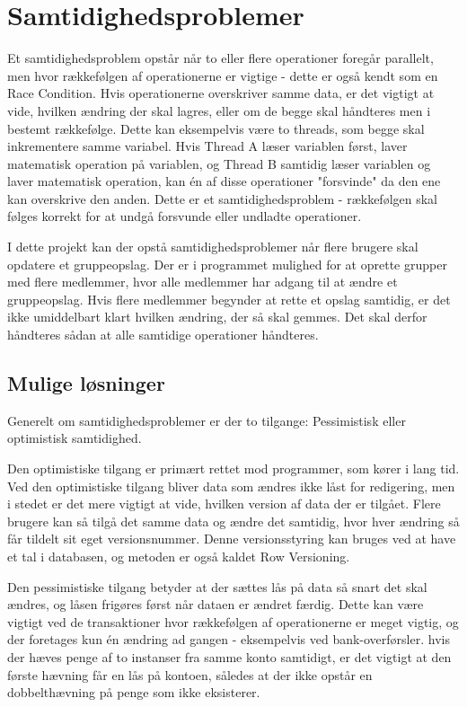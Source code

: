 \chapter{Samtidighedsproblemer}\label{ch:concurrency}
Et samtidighedsproblem opstår når to eller flere operationer foregår parallelt, men hvor rækkefølgen af operationerne er vigtige - dette er også kendt som en Race Condition.\cite{racecondition} Hvis operationerne overskriver samme data, er det vigtigt at vide, hvilken ændring der skal lagres, eller om de begge skal håndteres men i bestemt rækkefølge. Dette kan eksempelvis være to threads, som begge skal inkrementere samme variabel. Hvis Thread A læser variablen først, laver matematisk operation på variablen, og Thread B samtidig læser variablen og laver matematisk operation, kan én af disse operationer "forsvinde" da den ene kan overskrive den anden. Dette er et samtidighedsproblem - rækkefølgen skal følges korrekt for at undgå forsvunde eller undladte operationer.

I dette projekt kan der opstå samtidighedsproblemer når flere brugere skal opdatere et gruppeopslag. Der er i programmet mulighed for at oprette grupper med flere medlemmer, hvor alle medlemmer har adgang til at ændre et gruppeopslag. Hvis flere medlemmer begynder at rette et opslag samtidig, er det ikke umiddelbart klart hvilken ændring, der så skal gemmes. Det skal derfor håndteres sådan at alle samtidige operationer håndteres.


\section{Mulige løsninger}\label{sec:solutions}
Generelt om samtidighedsproblemer er der to tilgange: Pessimistisk eller optimistisk samtidighed. 

Den optimistiske tilgang er primært rettet mod programmer, som kører i lang tid. Ved den optimistiske tilgang bliver data som ændres ikke låst for redigering, men i stedet er det mere vigtigt at vide, hvilken version af data der er tilgået. Flere brugere kan så tilgå det samme data og ændre det samtidig, hvor hver ændring så får tildelt sit eget versionsnummer. Denne versionsstyring kan bruges ved at have et tal i databasen, og metoden er også kaldet Row Versioning\cite{rowversioning}.

Den pessimistiske tilgang betyder at der sættes lås på data så snart det skal ændres, og låsen frigøres først når dataen er ændret færdig. Dette kan være vigtigt ved de transaktioner hvor rækkefølgen af operationerne er meget vigtig, og der foretages kun én ændring ad gangen - eksempelvis ved bank-overførsler. hvis der hæves penge af to instanser fra samme konto samtidigt, er det vigtigt at den første hævning får en lås på kontoen, således at der ikke opstår en dobbelthævning på penge som ikke eksisterer. 



